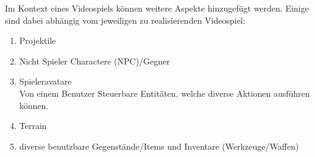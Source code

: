 Im Kontext eines Videospiels können weitere Aspekte hinzugefügt werden. Einige sind dabei abhängig vom jeweiligen zu realisierenden Videospiel:
\begin{enumerate}
\item Projektile
\item Nicht Spieler Charactere (NPC)/Gegner
\item Spieleravatare\\
Von einem Benutzer Steuerbare Entitäten, welche diverse Aktionen ausführen können.
\item Terrain
\item diverse benutzbare Gegenstände/Items und Inventare (Werkzeuge/Waffen)
\end{enumerate}



